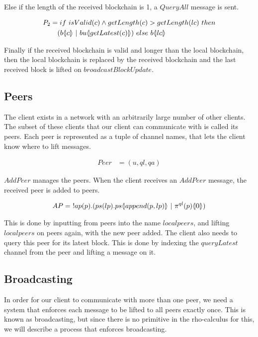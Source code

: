 Else if the length of the received blockchain is 1, a $QueryAll$ message is sent.

\begin{align*}
	P_2 &= if\ isValid(c) \land getLength(c) > getLength(lc)\ then\\
	&\quad(b\lift{}{c}\ |\ bu \lift{}{getLatest(c)})\ else\ b\lift{}{lc}
\end{align*}

Finally if the received blockchain is valid and longer than the local blockchain, then the local blockchain is replaced by the received blockchain and the last received block is lifted on $broadcastBlockUpdate$.

\subsection{Peers}
The client exists in a network with an arbitrarily large number of other clients.
The subset of these clients that our client can communicate with is called its peers.
Each peer is represented as a tuple of channel names, that lets the client know where to lift messages.

\begin{align*}
    Peer &= (u, ql, qa)
\end{align*}

$AddPeer$ manages the peers.
When the client receives an $AddPeer$ message, the received peer is added to peers.

\begin{align*}
    AP &=\ !ap(p).(ps(lp).ps\lift{}{append(p,lp)}\ |\ \pi^{ql}(p)\lift{}{0})\\
\end{align*}

This is done by inputting from peers into the name $localpeers$, and lifting $localpeers$ on peers again, with the new peer added.
The client also needs to query this peer for its latest block.
This is done by indexing the $queryLatest$ channel from the peer and lifting a message on it.

\subsection{Broadcasting} \label{broadcast}
In order for our client to communicate with more than one peer, we need a system that enforces each message to be lifted to all peers exactly once.
This is known as broadcasting, but since there is no primitive in the rho-calculus for this, we will describe a process that enforces broadcasting.

